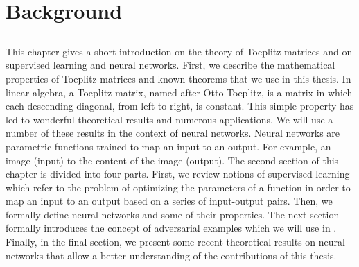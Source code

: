 \chapter{Background}
\label{chapter:ch2-background}
\localtoc

\section*{}

This chapter gives a short introduction on the theory of Toeplitz matrices and on supervised learning and neural networks.
First, we describe the mathematical properties of Toeplitz matrices and known theorems that we use in this thesis. 
In linear algebra, a Toeplitz matrix, named after Otto Toeplitz, is a matrix in which each descending diagonal, from left to right, is constant.
This simple property has led to wonderful theoretical results and numerous applications.
We will use a number of these results in the context of neural networks.
Neural networks are parametric functions trained to map an input to an output.
For example, an image (input) to the content of the image (output).
The second section of this chapter is divided into four parts.
First, we review notions of supervised learning which refer to the problem of optimizing the parameters of a function in order to map an input to an output based on a series of input-output pairs.
Then, we formally define neural networks and some of their properties.
The next section formally introduces the concept of adversarial examples which we will use in .
Finally, in the final section, we present some recent theoretical results on neural networks that allow a better understanding of the contributions of this thesis.






